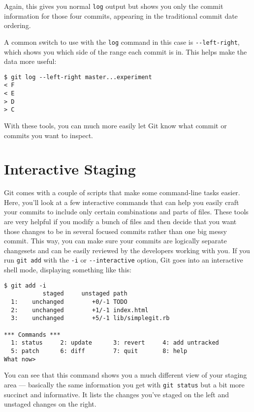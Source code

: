 \documentclass[a4paper]{book}
\begin{document}
Again, this gives you normal \texttt{log} output but shows you only the commit information for those four commits, appearing in the traditional commit date ordering.

A common switch to use with the \texttt{log} command in this case is \texttt{-{}-left-right}, which shows you which side of the range each commit is in. This helps make the data more useful:

\begin{shaded}\begin{verbatim}
$ git log --left-right master...experiment
< F
< E
> D
> C
\end{verbatim}\end{shaded}

With these tools, you can much more easily let Git know what commit or commits you want to inspect.

\section{Interactive Staging}\label{interactive-staging}

Git comes with a couple of scripts that make some command-line tasks easier. Here, you'll look at a few interactive commands that can help you easily craft your commits to include only certain combinations and parts of files. These tools are very helpful if you modify a bunch of files and then decide that you want those changes to be in several focused commits rather than one big messy commit. This way, you can make sure your commits are logically separate changesets and can be easily reviewed by the developers working with you. If you run \texttt{git add} with the \texttt{-i} or \texttt{-{}-interactive} option, Git goes into an interactive shell mode, displaying something like this:

\begin{shaded}\begin{verbatim}
$ git add -i
           staged     unstaged path
  1:    unchanged        +0/-1 TODO
  2:    unchanged        +1/-1 index.html
  3:    unchanged        +5/-1 lib/simplegit.rb

*** Commands ***
  1: status     2: update      3: revert     4: add untracked
  5: patch      6: diff        7: quit       8: help
What now>
\end{verbatim}\end{shaded}

You can see that this command shows you a much different view of your staging area --- basically the same information you get with \texttt{git status} but a bit more succinct and informative. It lists the changes you've staged on the left and unstaged changes on the right.
\end{document}
